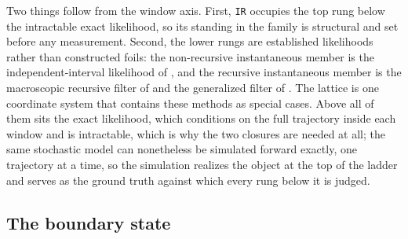 Two things follow from the window axis. First, \texttt{IR} occupies the top rung below the
intractable exact likelihood, so its standing in the family is structural and set before
any measurement. Second, the lower rungs are established likelihoods rather than
constructed foils: the non-recursive instantaneous member is the independent-interval
likelihood of \citet{milescu2005maximum}, and the recursive instantaneous member is the
macroscopic recursive filter of \citet{moffatt2007estimation} and the generalized filter
of \citet{munch2022bayesian}. The lattice is one coordinate system that contains these
methods as special cases. Above all of them sits the exact likelihood, which conditions on the
full trajectory inside each window and is intractable, which is why the two closures are
needed at all; the same stochastic model can nonetheless be simulated forward exactly, one
trajectory at a time, so the simulation realizes the object at the top of the ladder and
serves as the ground truth against which every rung below it is judged.

\subsection*{The boundary state}

